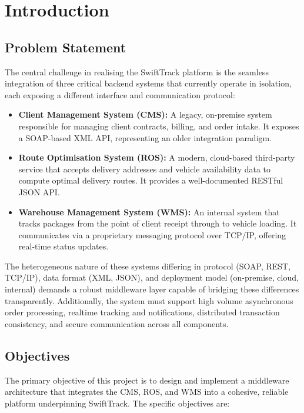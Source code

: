 \section{Introduction}
\label{sec:introduction}

\subsection{Problem Statement}
The central challenge in realising the SwiftTrack platform is the seamless integration of three critical backend systems that currently operate in isolation, each exposing a different interface and communication protocol:

\begin{itemize}
    \item \textbf{Client Management System (CMS):} A legacy, on-premise system responsible for managing client contracts, billing, and order intake. It exposes a SOAP-based XML API, representing an older integration paradigm.
    \item \textbf{Route Optimisation System (ROS):} A modern, cloud-based third-party service that accepts delivery addresses and vehicle availability data to compute optimal delivery routes. It provides a well-documented RESTful JSON API.
    \item \textbf{Warehouse Management System (WMS):} An internal system that tracks packages from the point of client receipt through to vehicle loading. It communicates via a proprietary messaging protocol over TCP/IP, offering real-time status updates.
\end{itemize}

The heterogeneous nature of these systems differing in protocol (SOAP, REST, TCP/IP), data format (XML, JSON), and deployment model (on-premise, cloud, internal) demands a robust middleware layer capable of bridging these differences transparently. Additionally, the system must support high volume asynchronous order processing, realtime tracking and notifications, distributed transaction consistency, and secure communication across all components.

\subsection{Objectives}
The primary objective of this project is to design and implement a middleware architecture that integrates the CMS, ROS, and WMS into a cohesive, reliable platform underpinning SwiftTrack. The specific objectives are:

